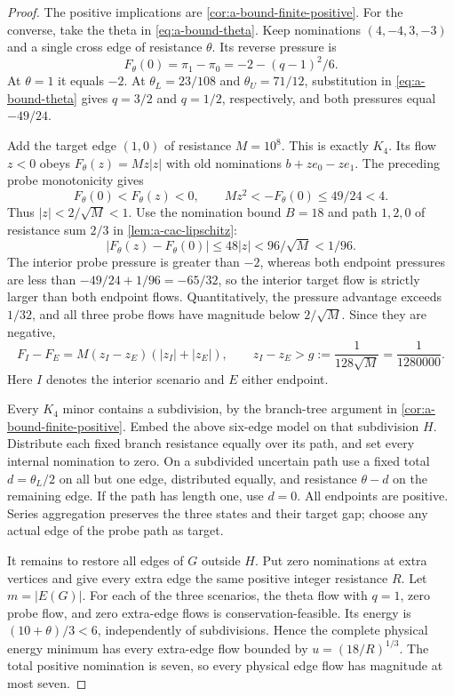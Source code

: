 \begin{proof}
The positive implications are \cref{cor:a-bound-finite-positive}.
For the converse, take the theta in \cref{eq:a-bound-theta}.
Keep nominations $(4,-4,3,-3)$ and a
single cross edge of resistance $\theta$. Its reverse pressure is
\[
 F_\theta(0)=\pi_1-\pi_0=-2-(q-1)^2/6.
\]
At $\theta=1$ it equals $-2$. At
$\theta_L=23/108$ and $\theta_U=71/12$, substitution in
\cref{eq:a-bound-theta} gives $q=3/2$ and $q=1/2$, respectively,
and both pressures equal $-49/24$.

Add the target edge $(1,0)$ of resistance $M=10^8$. This is exactly
$K_4$. Its flow $z<0$ obeys $F_\theta(z)=Mz|z|$ with old nominations
$b+z e_0-z e_1$. The preceding probe monotonicity gives
\[
 F_\theta(0)<F_\theta(z)<0,\qquad
 Mz^2<-F_\theta(0)\le49/24<4.
\]
Thus $|z|<2/\sqrt M<1$. Use the nomination bound $B=18$ and path
$1,2,0$ of resistance sum $2/3$ in \cref{lem:a-cac-lipschitz}:
\[
 |F_\theta(z)-F_\theta(0)|\le48|z|
 <96/\sqrt M<1/96.
\]
The interior probe pressure is greater than $-2$, whereas both endpoint
pressures are less than $-49/24+1/96=-65/32$, so the interior target
flow is strictly larger than both endpoint flows. Quantitatively, the
pressure advantage exceeds $1/32$, and all three probe flows have
magnitude below $2/\sqrt M$. Since they are negative,
\[
 F_I-F_E=M(z_I-z_E)(|z_I|+|z_E|),\qquad
 z_I-z_E>g:=\frac1{128\sqrt M}=\frac1{1280000}.
\]
Here $I$ denotes the interior scenario and $E$ either endpoint.

Every $K_4$ minor contains a subdivision, by the branch-tree argument
in \cref{cor:a-bound-finite-positive}. Embed the above six-edge model
on that subdivision $H$. Distribute each fixed branch resistance
equally over its path, and set every internal nomination to zero.
On a subdivided uncertain path use a fixed total
$d=\theta_L/2$ on all but one edge, distributed equally, and resistance
$\theta-d$ on the remaining edge. If the path has length one, use
$d=0$. All endpoints are positive. Series aggregation preserves the
three states and their target gap; choose any actual edge of the probe
path as target.

It remains to restore all edges of $G$ outside $H$. Put zero
nominations at extra vertices and give every
extra edge the same positive integer resistance $R$. Let $m=|E(G)|$.
For each of the three scenarios, the theta flow with $q=1$, zero probe
flow, and zero extra-edge flows is conservation-feasible. Its energy is
$(10+\theta)/3<6$, independently of subdivisions. Hence the complete
physical energy minimum has every extra-edge flow bounded by
$u=(18/R)^{1/3}$. The total positive nomination is seven, so every
physical edge flow has magnitude at most seven.


\end{proof}
